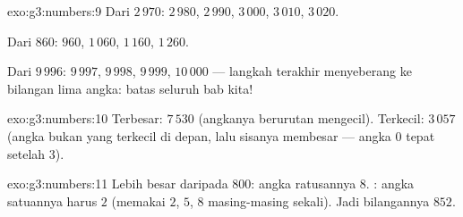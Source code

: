 \begin{solution}{exo:g3:numbers:9}
Dari $2\,970$: $2\,980$, $2\,990$, $3\,000$, $3\,010$, $3\,020$.

Dari $860$: $960$, $1\,060$, $1\,160$, $1\,260$.

Dari $9\,996$: $9\,997$, $9\,998$, $9\,999$, $10\,000$ --- langkah
terakhir menyeberang ke bilangan lima angka: batas seluruh bab kita!
\end{solution}

\begin{solution}{exo:g3:numbers:10}
Terbesar: $7\,530$ (angkanya berurutan mengecil). Terkecil: $3\,057$
(angka bukan  yang terkecil di depan, lalu sisanya membesar ---
angka $0$ tepat setelah $3$).
\end{solution}

\begin{solution}{exo:g3:numbers:11}
Lebih besar daripada $800$: angka ratusannya $8$. : angka
satuannya harus $2$ (memakai $2$, $5$, $8$ masing-masing sekali).
Jadi bilangannya $852$.

\end{solution}

